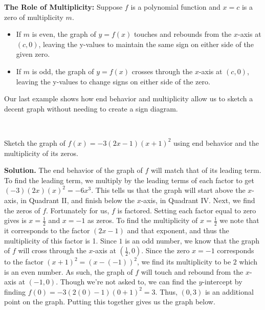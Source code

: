 \begin{thm} \label{roleofmultiplicity}
 \textbf{The Role of Multiplicity:}  Suppose $f$ is a polynomial function  and $x=c$ is a zero of multiplicity $m$.  

\begin{itemize}

\item  If $m$ is even, the graph of $y=f(x)$ touches and rebounds from the $x$-axis at $(c,0)$, leaving the y-values to maintain the same sign on either side of the given zero.

\item  If $m$ is odd, the graph of $y=f(x)$ crosses through the $x$-axis at $(c,0)$, leaving the y-values to change signs on either side of the zero.

\end{itemize}

\end{thm}

\medskip

Our last example shows how end behavior and multiplicity allow us to sketch a decent graph without needing to create a sign diagram. 

\begin{example}
 \ 
\end{example} Sketch the graph of $f(x) = -3(2x-1)(x+1)^2$ using end behavior and the multiplicity of its zeros.

\bigskip

{ \bf Solution.}  The end behavior of the graph of $f$ will match that of its leading term.  To find the leading term, we multiply by the leading terms of each factor to get $(-3)(2x)(x)^2 = -6x^3$.  This tells us that the graph will start above the $x$-axis, in Quadrant II, and finish below the $x$-axis, in Quadrant IV.  Next, we find the zeros of $f$.  Fortunately for us, $f$ is factored.
Setting each factor equal to zero gives is $x = \frac{1}{2}$ and $x=-1$ as zeros. To find the multiplicity of $x=\frac{1}{2}$ we note that it corresponds to the factor $(2x-1)$ and that exponent, and thus the multiplicity of this factor is 1.
Since $1$ is an odd number, we know that the graph of $f$ will cross through the $x$-axis at $\left(\frac{1}{2},0\right)$.   Since the zero $x=-1$ corresponds to the factor $(x+1)^2 = (x-(-1))^2$, we find its multiplicity to be $2$ which is an even number.  As such, the graph of $f$ will touch and rebound from the $x$-axis at $(-1,0)$.  Though we're not asked to, we can find the $y$-intercept by finding $f(0) = -3(2(0)-1)(0+1)^2 = 3$.  Thus,  $(0,3)$ is an additional point on the graph.  Putting this together gives us the graph below.

